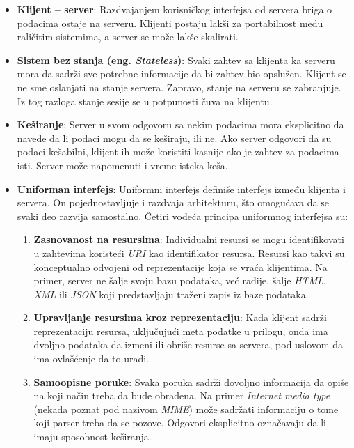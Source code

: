 \begin{itemize}

	\item \textbf{Klijent -- server}: Razdvajanjem korisničkog interfejsa od servera briga o podacima 
	ostaje na serveru. Klijenti postaju lakši za portabilnost među raličitim sistemima, a server se može
    lakše skalirati.
	
    \item \textbf{Sistem bez stanja (eng. \textit{Stateless})}: Svaki zahtev sa klijenta ka serveru mora da sadrži 
	sve potrebne informacije da bi zahtev bio opslužen. Klijent se ne sme oslanjati na stanje servera. 
    Zapravo, stanje na serveru se zabranjuje. Iz tog razloga stanje sesije se u potpunosti čuva na klijentu.
	
    \item \textbf{Keširanje}: Server u svom odgovoru sa nekim podacima mora eksplicitno da navede da li 
    podaci mogu da se keširaju, ili ne. Ako server odgovori da su podaci kešabilni, klijent ih može 
    koristiti kasnije ako je zahtev za podacima isti. Server može napomenuti i vreme isteka keša.
    
    \item \textbf{Uniforman interfejs}: Uniformni interfejs definiše interfejs između klijenta i servera.
    On pojednostavljuje i razdvaja arhitekturu, što omogućava da se svaki deo razvija samostalno. 
    Četiri vodeća principa uniformnog interfejsa su:

    \begin{enumerate}
        \item \textbf{Zasnovanost na resursima}: Individualni resursi se mogu identifikovati u 
        zahtevima koristeći \textit{URI} kao identifikator resursa. Resursi kao takvi su konceptualno odvojeni 
        od reprezentacije koja se vraća klijentima. Na primer, server ne šalje svoju bazu podataka, 
        već radije, šalje \textit{HTML}, \textit{XML} ili \textit{JSON} koji predstavljaju traženi zapis iz baze podataka.

        \item \textbf{Upravljanje resursima kroz reprezentaciju}: Kada klijent sadrži reprezentaciju resursa,
        uključujući meta podatke u prilogu, onda ima dvoljno podataka da izmeni ili obriše resurse 
        sa servera, pod uslovom da ima ovlašćenje da to uradi.

        \item \textbf{Samoopisne poruke}: Svaka poruka sadrži dovoljno informacija da opiše na koji 
        način treba da bude obrađena. Na primer \textit{Internet media type} (nekada poznat pod nazivom \textit{MIME}) 
        može sadržati informaciju o tome koji parser treba da se pozove. Odgovori eksplicitno 
        označavaju da li imaju sposobnost keširanja.


\end{enumerate}
\end{itemize}
